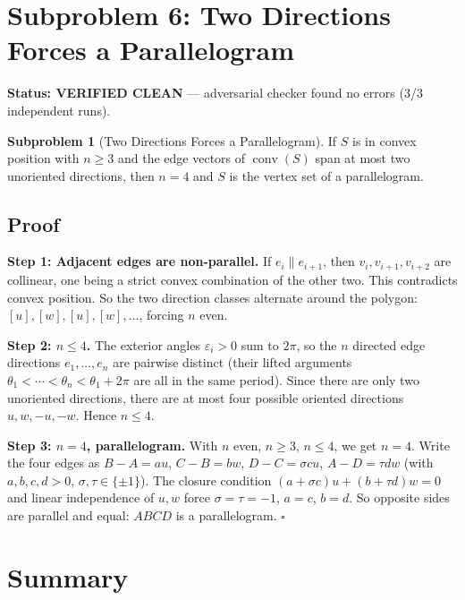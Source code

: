 \documentclass[12pt,a4paper]{article}
\theoremstyle{definition}
\newtheorem{subproblem}{Subproblem}
\begin{document}
\section{Subproblem 6: Two Directions Forces a Parallelogram}

\begin{cleanenv}
\textbf{Status: VERIFIED CLEAN} --- adversarial checker found no errors (3/3 independent runs).
\end{cleanenv}

\begin{subproblem}[Two Directions Forces a Parallelogram]\label{sp:6}
If $S$ is in convex position with $n\ge 3$ and the edge vectors of $\operatorname{conv}(S)$
span at most two unoriented directions, then $n=4$ and $S$ is the vertex set of a parallelogram.
\end{subproblem}

\subsection*{Proof}

\textbf{Step 1: Adjacent edges are non-parallel.}
If $e_i\parallel e_{i+1}$, then $v_i,v_{i+1},v_{i+2}$ are collinear, one being a strict
convex combination of the other two.  This contradicts convex position.
So the two direction classes alternate around the polygon: $[u],[w],[u],[w],\ldots$,
forcing $n$ even.

\textbf{Step 2: $n\le 4$.}
The exterior angles $\varepsilon_i>0$ sum to $2\pi$, so the $n$ directed edge directions
$e_1,\ldots,e_n$ are pairwise distinct (their lifted arguments
$\theta_1<\cdots<\theta_n<\theta_1+2\pi$ are all in the same period).
Since there are only two unoriented directions, there are at most four possible
oriented directions $u,w,-u,-w$.  Hence $n\le 4$.

\textbf{Step 3: $n=4$, parallelogram.}
With $n$ even, $n\ge 3$, $n\le 4$, we get $n=4$.
Write the four edges as $B-A=au$, $C-B=bw$, $D-C=\sigma cu$, $A-D=\tau dw$
(with $a,b,c,d>0$, $\sigma,\tau\in\{\pm1\}$).
The closure condition $(a+\sigma c)u+(b+\tau d)w=0$ and linear independence of
$u,w$ force $\sigma=\tau=-1$, $a=c$, $b=d$.
So opposite sides are parallel and equal: $ABCD$ is a parallelogram. $\square$

\section{Summary}
\end{document}

